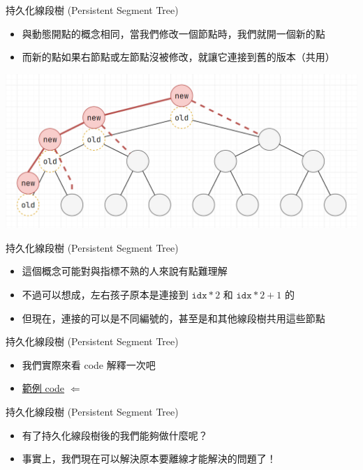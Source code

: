 \documentclass[aspectratio=169]{beamer}
\begin{document}
    \begin{frame}{持久化線段樹 (Persistent Segment Tree)}
        \begin{itemize}
            \item 與動態開點的概念相同，當我們修改一個節點時，我們就開一個新的點
            \item 而新的點如果右節點或左節點沒被修改，就讓它連接到舊的版本（共用）
        \end{itemize}
        \begin{center}
            \includegraphics[scale=0.4]{persistent/persisten_segment_tree.png}
        \end{center}
    \end{frame}

    \begin{frame}{持久化線段樹 (Persistent Segment Tree)}
        \begin{itemize}
            \item 這個概念可能對與指標不熟的人來說有點難理解
            \item 不過可以想成，左右孩子原本是連接到 $\texttt{idx}*2$ 和 $\texttt{idx}*2+1$ 的
            \item 但現在，連接的可以是不同編號的，甚至是和其他線段樹共用這些節點
        \end{itemize}
    \end{frame}

    \begin{frame}{持久化線段樹 (Persistent Segment Tree)}
        \begin{itemize}
            \item 我們實際來看 code 解釋一次吧
            \item \href{https://cses.fi/paste/b6682237eee12f582b9ad4/}{範例 code} $\Leftarrow$
        \end{itemize}
    \end{frame}

    \begin{frame}{持久化線段樹 (Persistent Segment Tree)}
        \begin{itemize}
            \item 有了持久化線段樹後的我們能夠做什麼呢？
            \item 事實上，我們現在可以解決原本要離線才能解決的問題了！
        \end{itemize}
    \end{frame}
\end{document}
